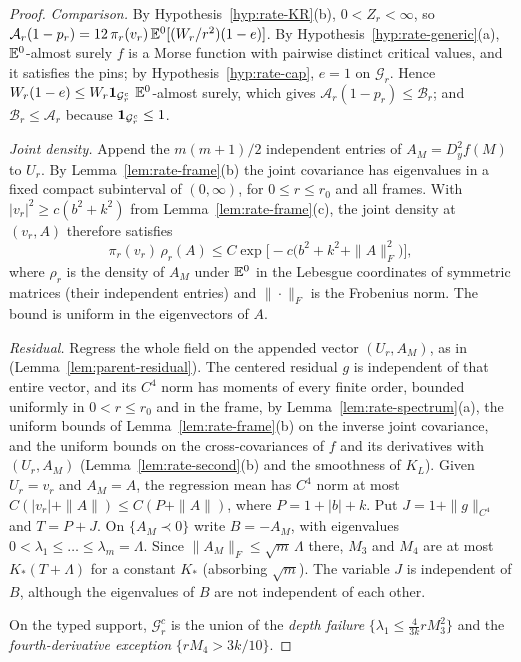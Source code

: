 \begin{proof}
\emph{Comparison.} By Hypothesis~\ref{hyp:rate-KR}(b), $0<Z_r<\infty$, so $\mathcal A_r(1-p_r)=12\,\pi_r(v_r)\,\mathbb E^0[(W_r/r^2)(1-e)]$. By Hypothesis~\ref{hyp:rate-generic}(a), $\mathbb E^0$-almost surely $f$ is a Morse function with pairwise distinct critical values, and it satisfies the pins; by Hypothesis~\ref{hyp:rate-cap}, $e=1$ on $\mathcal G_r$. Hence $W_r(1-e)\le W_r\mathbf 1_{\mathcal G_r^c}$ $\mathbb E^0$-almost surely, which gives $\mathcal A_r(1-p_r)\le\mathcal B_r$; and $\mathcal B_r\le\mathcal A_r$ because $\mathbf 1_{\mathcal G_r^c}\le1$.

\emph{Joint density.} Append the $m(m+1)/2$ independent entries of $A_M=D_y^2f(M)$ to $U_r$. By Lemma~\ref{lem:rate-frame}(b) the joint covariance has eigenvalues in a fixed compact subinterval of $(0,\infty)$, for $0\le r\le r_0$ and all frames. With $|v_r|^2\ge c(b^2+k^2)$ from Lemma~\ref{lem:rate-frame}(c), the joint density at $(v_r,A)$ therefore satisfies
\begin{equation}\label{eq:rate-R13}
\pi_r(v_r)\,\rho_r(A)\le C\exp\bigl[-c\bigl(b^2+k^2+\|A\|_F^2\bigr)\bigr],
\end{equation}
where $\rho_r$ is the density of $A_M$ under $\mathbb E^0$ in the Lebesgue coordinates of symmetric matrices (their independent entries) and $\|\cdot\|_F$ is the Frobenius norm. The bound is uniform in the eigenvectors of $A$.

\emph{Residual.} Regress the whole field on the appended vector $(U_r,A_M)$, as in \cite[\S4]{parentP} (Lemma~\ref{lem:parent-residual}). The centered residual $g$ is independent of that entire vector, and its $C^4$ norm has moments of every finite order, bounded uniformly in $0<r\le r_0$ and in the frame, by Lemma~\ref{lem:rate-spectrum}(a), the uniform bounds of Lemma~\ref{lem:rate-frame}(b) on the inverse joint covariance, and the uniform bounds on the cross-covariances of $f$ and its derivatives with $(U_r,A_M)$ (Lemma~\ref{lem:rate-second}(b) and the smoothness of $K_L$). Given $U_r=v_r$ and $A_M=A$, the regression mean has $C^4$ norm at most $C(|v_r|+\|A\|)\le C(P+\|A\|)$, where $P=1+|b|+k$. Put $J=1+\|g\|_{C^4}$ and $T=P+J$. On $\{A_M\prec0\}$ write $B=-A_M$, with eigenvalues $0<\lambda_1\le\dots\le\lambda_m=\Lambda$. Since $\|A_M\|_F\le\sqrt m\,\Lambda$ there, $M_3$ and $M_4$ are at most $K_*(T+\Lambda)$ for a constant $K_*$ (absorbing $\sqrt m$). The variable $J$ is independent of $B$, although the eigenvalues of $B$ are not independent of each other.

On the typed support, $\mathcal G_r^c$ is the union of the \emph{depth failure} $\{\lambda_1\le\frac4{3k}rM_3^2\}$ and the \emph{fourth-derivative exception} $\{rM_4>3k/10\}$.


\end{proof}
